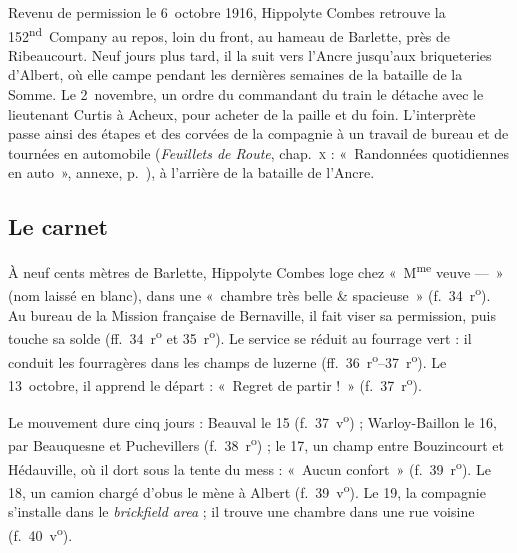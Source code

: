 
Revenu de permission le 6~octobre 1916, Hippolyte Combes retrouve la 152\textsuperscript{nd}~Company au repos, loin du front, au hameau de Barlette, près de Ribeaucourt. Neuf jours plus tard, il la suit vers l'Ancre jusqu'aux briqueteries d'Albert, où elle campe pendant les dernières semaines de la bataille de la Somme. Le 2~novembre, un ordre du commandant du train le détache avec le lieutenant Curtis à Acheux, pour acheter de la paille et du foin. L'interprète passe ainsi des étapes et des corvées de la compagnie à un travail de bureau et de tournées en automobile (\textit{Feuillets de Route}, chap.~\textsc{x} : «~Randonnées quotidiennes en auto~», annexe, p.~\pageref{annexe:doc6-x}), à l'arrière de la bataille de l'Ancre.

\subsection*{Le carnet}

À neuf cents mètres de Barlette, Hippolyte Combes loge chez «~M\textsuperscript{me} veuve —~» (nom laissé en blanc), dans une «~chambre très belle \& spacieuse~» (f.~34~r\textsuperscript{o}). Au bureau de la Mission française de Bernaville, il fait viser sa permission, puis touche sa solde (ff.~34~r\textsuperscript{o} et 35~r\textsuperscript{o}). Le service se réduit au fourrage vert : il conduit les fourragères dans les champs de luzerne (ff.~36~r\textsuperscript{o}--37~r\textsuperscript{o}). Le 13~octobre, il apprend le départ : «~Regret de partir !~» (f.~37~r\textsuperscript{o}).

Le mouvement dure cinq jours : Beauval le 15 (f.~37~v\textsuperscript{o}) ; Warloy-Baillon le 16, par Beauquesne et Puchevillers (f.~38~r\textsuperscript{o}) ; le 17, un champ entre Bouzincourt et Hédauville, où il dort sous la tente du mess : «~Aucun confort~» (f.~39~r\textsuperscript{o}). Le 18, un camion chargé d'obus le mène à Albert (f.~39~v\textsuperscript{o}). Le 19, la compagnie s'installe dans le \textit{brickfield area} ; il trouve une chambre dans une rue voisine (f.~40~v\textsuperscript{o}).

